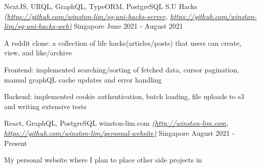 

\begin{cventries}
  \cventry
  {NextJS, URQL, GraphQL, TypeORM, PostgreSQL} %
  {S.U Hacks \textmd{\em\tiny(\url{https://github.com/winston-lim/sg-uni-hacks-server}, \url{https://github.com/winston-lim/sg-uni-hacks-web)}}} %
  {Singapore} %
  {June 2021 - August 2021} %
  {
    \begin{cvitems}
      \item {A reddit clone: a collection of life hacks(articles/posts) that users can create, view, and like/archive }
      \item {Frontend: implemented searching/sorting of fetched data, cursor pagination, manual graphQL cache updates and error handling }
      \item {Backend: implemented cookie authentication, batch loading, file uploads to s3 and writing extensive tests }
    \end{cvitems}
  }
  \cventry
  {React, GraphQL, PostgreSQL} %
  {winston-lim.com \textmd{\em\tiny(\url{http://winston-lim.com}, \url{https://github.com/winston-lim/personal-website)}}} %
  {Singapore} %
  {August 2021 - Present} %
  {
    \begin{cvitems}
      \item {My personal website where I plan to place other side projects in}
    \end{cvitems}
  }

\end{cventries}